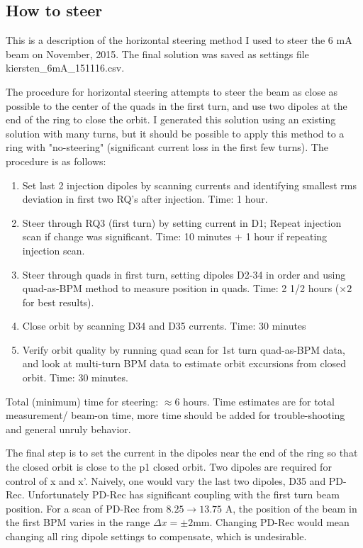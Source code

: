 \subsection{How to steer}
This is a description of the horizontal steering method I used to steer the 6 mA beam on November, 2015. The final solution was saved as settings file kiersten\_6mA\_151116.csv.

The procedure for horizontal steering attempts to steer the beam as close as possible to the center of the quads in the first turn, and use two dipoles at the end of the ring to close the orbit. I generated this solution using an existing solution with many turns, but it should be possible to apply this method to a ring with "no-steering" (significant current loss in the first few turns).
The procedure is as follows:

\begin{enumerate}
\item Set last 2 injection dipoles by scanning currents and identifying smallest rms deviation in first two RQ's after injection. Time: 1 hour.
\item Steer through RQ3 (first turn) by setting current in D1; Repeat injection scan if change was significant. Time: 10 minutes + 1 hour if repeating injection scan.
\item Steer through quads in first turn, setting dipoles D2-34 in order and using quad-as-BPM method to measure position in quads. Time: 2 1/2 hours ($\times 2$ for best results).
\item Close orbit by scanning D34 and D35 currents.  Time: 30 minutes
\item Verify orbit quality by running quad scan for 1st turn quad-as-BPM data, and look at multi-turn BPM data to estimate orbit excursions from closed orbit. Time: 30 minutes.
\end{enumerate}

 Total (minimum) time for steering: $\approx 6$ hours. Time estimates are for total measurement/ beam-on time, more time should be added for trouble-shooting and general unruly behavior.
 
 
 
 
 
The final step is to set the current in the dipoles near the end of the ring so that the closed orbit is close to the p1 closed orbit.  Two dipoles are required for control of x and x'. Naively, one would vary the last two dipoles, D35 and PD-Rec. Unfortunately PD-Rec has significant coupling with the first turn beam position. For a scan of PD-Rec from $8.25 \rightarrow 13.75$ A, the position of the beam in the first BPM varies in the range $\Delta x = \pm 2$mm. Changing PD-Rec would mean changing all ring dipole settings to compensate, which is undesirable. 

